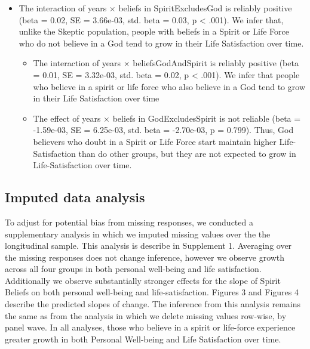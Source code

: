 \documentclass[
  english,
  man]{apa6}
\providecommand{\tightlist}{%
  \setlength{\itemsep}{0pt}\setlength{\parskip}{0pt}}
\begin{document}
\begin{itemize}
\tightlist
\item
  The interaction of years \(\times\) beliefs in SpiritExcludesGod is reliably positive (beta = 0.02, SE = 3.66e-03, std. beta = 0.03, p \textless{} .001). We infer that, unlike the Skeptic population, people with beliefs in a Spirit or Life Force who do not believe in a God tend to grow in their Life Satisfaction over time.

  \begin{itemize}
  \tightlist
  \item
    The interaction of years \(\times\) beliefsGodAndSpirit is reliably positive (beta = 0.01, SE = 3.32e-03, std. beta = 0.02, p \textless{} .001). We infer that people who believe in a spirit or life force who also believe in a God tend to grow in their Life Satisfaction over time
  \item
    The effect of years \(\times\) beliefs in GodExcludesSpirit is not reliable (beta = -1.59e-03, SE = 6.25e-03, std. beta = -2.70e-03, p = 0.799). Thus, God believers who doubt in a Spirit or Life Force start maintain higher Life-Satisfaction than do other groups, but they are not expected to grow in Life-Satisfaction over time.
  \end{itemize}
\end{itemize}

\hypertarget{imputed-data-analysis}{%
\subsection{Imputed data analysis}\label{imputed-data-analysis}}

To adjust for potential bias from missing responses, we conducted a supplementary analysis in which we imputed missing values over the the longitudinal sample. This analysis is describe in Supplement 1. Averaging over the missing responses does not change inference, however we observe growth across all four groups in both personal well-being and life satisfaction. Additionally we observe substantially stronger effects for the slope of Spirit Beliefs on both personal well-being and life-satisfaction. Figures 3 and Figures 4 describe the predicted slopes of change. The inference from this analysis remains the same as from the analysis in which we delete missing values row-wise, by panel wave. In all analyses, those who believe in a spirit or life-force experience greater growth in both Personal Well-being and Life Satisfaction over time.
\end{document}
